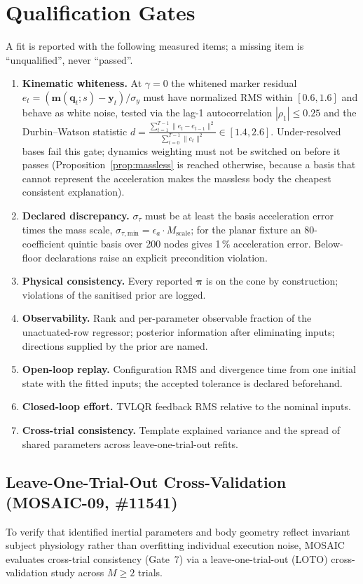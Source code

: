 \documentclass[11pt,a4paper]{article}
\newcommand{\bpi}{\boldsymbol{\pi}}
\begin{document}
\section{Qualification Gates}
\label{sec:gates}
A fit is reported with the following measured items; a missing item is
``unqualified'', never ``passed''.
\begin{enumerate}[nosep]
  \item \textbf{Kinematic whiteness.} At $\gamma=0$ the whitened marker
    residual $e_t = (\mathbf{m}(\mathbf{q}_t; s) - \mathbf{y}_t) / \sigma_y$
    must have normalized RMS within $[0.6, 1.6]$ and behave as white noise,
    tested via the lag-1 autocorrelation $|\rho_1| \le 0.25$ and the Durbin--Watson
    statistic $d = \frac{\sum_{t=1}^{T-1} \|e_t - e_{t-1}\|^2}{\sum_{t=0}^{T-1} \|e_t\|^2} \in [1.4, 2.6]$.
    Under-resolved bases fail this gate; dynamics weighting must not be
    switched on before it passes (Proposition~\ref{prop:massless} is reached
    otherwise, because a basis that cannot represent the acceleration makes the
    massless body the cheapest consistent explanation).
  \item \textbf{Declared discrepancy.} $\sigma_\tau$ must be at least the basis
    acceleration error times the mass scale, $\sigma_{\tau,\text{min}} = \epsilon_a \cdot M_{\text{scale}}$;
    for the planar fixture an 80-coefficient quintic basis over 200 nodes gives 1\,\% acceleration error.
    Below-floor declarations raise an explicit precondition violation.
  \item \textbf{Physical consistency.} Every reported $\bpi$ is on the cone by
    construction; violations of the sanitised prior are logged.
  \item \textbf{Observability.} Rank and per-parameter observable fraction of
    the unactuated-row regressor; posterior information after eliminating
    inputs; directions supplied by the prior are named.
  \item \textbf{Open-loop replay.} Configuration RMS and divergence time from
    one initial state with the fitted inputs; the accepted tolerance is
    declared beforehand.
  \item \textbf{Closed-loop effort.} TVLQR feedback RMS relative to the
    nominal inputs.
  \item \textbf{Cross-trial consistency.} Template explained variance and the
    spread of shared parameters across leave-one-trial-out refits.
\end{enumerate}

\subsection{Leave-One-Trial-Out Cross-Validation (MOSAIC-09, \#11541)}
\label{subsec:leave_one_trial_out}
To verify that identified inertial parameters and body geometry reflect invariant subject physiology rather than overfitting individual execution noise, MOSAIC evaluates cross-trial consistency (Gate~7) via a leave-one-trial-out (LOTO) cross-validation study across $M \ge 2$ trials.
\end{document}
